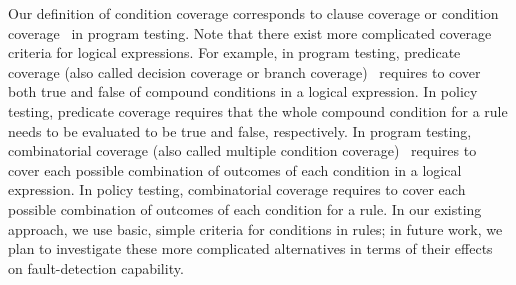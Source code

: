 Our definition of condition coverage corresponds to clause coverage
or condition coverage~\cite{myers79:art} in program testing. Note
that there exist more complicated coverage criteria for logical
expressions. For example, in program testing, predicate coverage
(also called decision coverage or branch
coverage)~\cite{myers79:art} requires to cover both true and false
of compound conditions in a logical expression. In policy testing,
predicate coverage requires that the whole compound condition for a
rule needs to be evaluated to be true and false, respectively. In
program testing, combinatorial coverage (also called multiple
condition coverage)~\cite{myers79:art} requires to cover each
possible combination of outcomes of each condition in a logical
expression. In policy testing, combinatorial coverage requires to
cover each possible combination of outcomes of each condition for a
rule. In our existing approach, we use basic, simple criteria for
conditions in rules; in future work, we plan to investigate these
more complicated alternatives in terms of their effects on
fault-detection capability.
